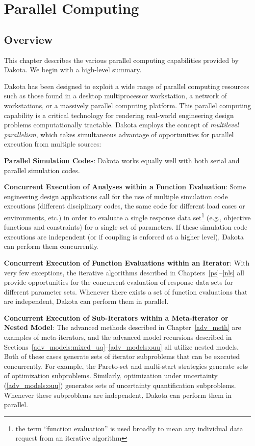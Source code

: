 \chapter{Parallel Computing}\label{parallel}

\section{Overview}\label{parallel:overview}

This chapter describes the various parallel computing capabilities
provided by Dakota.  We begin with a high-level summary.

Dakota has been designed to exploit a wide range of parallel
computing resources such as those found in a desktop multiprocessor
workstation, a network of workstations, or a massively parallel
computing platform. This parallel computing capability is a critical
technology for rendering real-world engineering design problems
computationally tractable. Dakota employs the concept of
\emph{multilevel parallelism}, which takes simultaneous advantage of
opportunities for parallel execution from multiple sources:

\textbf{Parallel Simulation Codes}: Dakota works equally well with both
serial and parallel simulation codes.

\textbf{Concurrent Execution of Analyses within a Function Evaluation}:
Some engineering design applications call for the use of multiple
simulation code executions (different disciplinary codes, the same
code for different load cases or environments, etc.) in order to
evaluate a single response data set\footnote{the term ``function 
evaluation'' is used broadly to mean any individual data request 
from an iterative algorithm} (e.g., objective functions and
constraints) for a single set of parameters. If these simulation code
executions are independent (or if coupling is enforced at a higher
level), Dakota can perform them concurrently.

\textbf{Concurrent Execution of Function Evaluations within an Iterator}: 
With very few exceptions, the iterative algorithms described in
Chapters~\ref{ps}--\ref{nls} all provide opportunities
for the concurrent evaluation of response data sets for different
parameter sets. Whenever there exists a set of function evaluations
that are independent, Dakota can perform them in parallel.

\textbf{Concurrent Execution of Sub-Iterators within a Meta-iterator
  or Nested Model}: The advanced methods described in
Chapter~\ref{adv_meth} are examples of meta-iterators, and the
advanced model recursions described in
Sections~\ref{adv_models:mixed_uq}--\ref{adv_models:ouu} all utilize
nested models. Both of these cases generate sets of iterator
subproblems that can be executed concurrently. For example, the
Pareto-set and multi-start strategies generate sets of optimization
subproblems. Similarly, optimization under uncertainty
(\ref{adv_models:ouu}) generates sets of uncertainty quantification
subproblems. Whenever these subproblems are independent, Dakota can
perform them in parallel.

